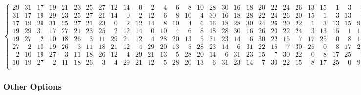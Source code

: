 \documentclass[fleqn, a4paper,12pt]{article}
\begin{document}
\[\begin{Bmatrix}
29 & 31 & 17 & 19 & 21 & 23 & 25 & 27 & 12 & 14 & \phantom{0}0 & \phantom{0}2 & \phantom{0}4 & \phantom{0}6 & \phantom{0}8 & 10 & 28 & 30 & 16 & 18 & 20 & 22 & 24 & 26 & 13 & 15 & \phantom{0}1 & \phantom{0}3 & \phantom{0}5 & \phantom{0}7 & 9 & 11 \\
31 & 17 & 19 & 29 & 23 & 25 & 27 & 21 & 14 & \phantom{0}0 & \phantom{0}2 & 12 & \phantom{0}6 & \phantom{0}8 & 10 & \phantom{0}4 & 30 & 16 & 18 & 28 & 22 & 24 & 26 & 20 & 15 & \phantom{0}1 & \phantom{0}3 & 13 & \phantom{0}7 & 9 & 11 & \phantom{0}5 \\
17 & 19 & 29 & 31 & 25 & 27 & 21 & 23 & \phantom{0}0 & \phantom{0}2 & 12 & 14 & \phantom{0}8 & 10 & \phantom{0}4 & \phantom{0}6 & 16 & 18 & 28 & 30 & 24 & 26 & 20 & 22 & \phantom{0}1 & \phantom{0}3 & 13 & 15 & 9 & 11 & \phantom{0}5 & \phantom{0}7 \\
19 & 29 & 31 & 17 & 27 & 21 & 23 & 25 & \phantom{0}2 & 12 & 14 & \phantom{0}0 & 10 & \phantom{0}4 & \phantom{0}6 & \phantom{0}8 & 18 & 28 & 30 & 16 & 26 & 20 & 22 & 24 & \phantom{0}3 & 13 & 15 & \phantom{0}1 & 11 & \phantom{0}5 & \phantom{0}7 & 9 \\
19 & 27 & \phantom{0}2 & 10 & 18 & 26 & \phantom{0}3 & 11 & 29 & 21 & 12 & \phantom{0}4 & 28 & 20 & 13 & \phantom{0}5 & 31 & 23 & 14 & \phantom{0}6 & 30 & 22 & 15 & \phantom{0}7 & 17 & 25 & \phantom{0}0 & \phantom{0}8 & 16 & 24 & \phantom{0}1 & 9 \\
27 & \phantom{0}2 & 10 & 19 & 26 & \phantom{0}3 & 11 & 18 & 21 & 12 & \phantom{0}4 & 29 & 20 & 13 & \phantom{0}5 & 28 & 23 & 14 & \phantom{0}6 & 31 & 22 & 15 & \phantom{0}7 & 30 & 25 & \phantom{0}0 & \phantom{0}8 & 17 & 24 & \phantom{0}1 & 9 & 16 \\
\phantom{0}2 & 10 & 19 & 27 & \phantom{0}3 & 11 & 18 & 26 & 12 & \phantom{0}4 & 29 & 21 & 13 & \phantom{0}5 & 28 & 20 & 14 & \phantom{0}6 & 31 & 23 & 15 & \phantom{0}7 & 30 & 22 & \phantom{0}0 & \phantom{0}8 & 17 & 25 & \phantom{0}1 & 9 & 16 & 24 \\
10 & 19 & 27 & \phantom{0}2 & 11 & 18 & 26 & \phantom{0}3 & \phantom{0}4 & 29 & 21 & 12 & \phantom{0}5 & 28 & 20 & 13 & \phantom{0}6 & 31 & 23 & 14 & \phantom{0}7 & 30 & 22 & 15 & \phantom{0}8 & 17 & 25 & \phantom{0}0 & 9 & 16 & 24 & \phantom{0}1 \\
\end{Bmatrix}
\]

\subsubsection{Other Options} %
\end{document}

